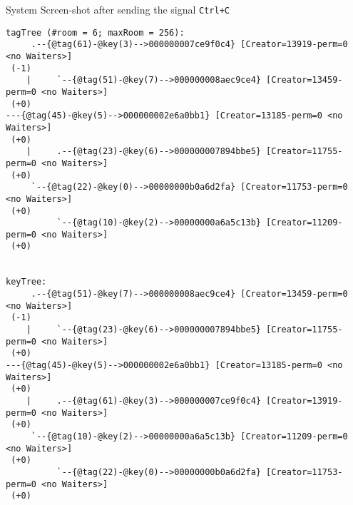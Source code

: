 \begin{center}\begin{large}
System Screen-shot after sending the signal \verb|Ctrl+C|
\end{large}\end{center}

\begin{indentPar}{1.5cm}
\begin{scriptsize}\begin{verbatim}
tagTree (#room = 6; maxRoom = 256):
     .--{@tag(61)-@key(3)-->000000007ce9f0c4} [Creator=13919-perm=0 <no Waiters>]
 (-1)
    |     `--{@tag(51)-@key(7)-->000000008aec9ce4} [Creator=13459-perm=0 <no Waiters>]
 (+0)
---{@tag(45)-@key(5)-->000000002e6a0bb1} [Creator=13185-perm=0 <no Waiters>]
 (+0)
    |     .--{@tag(23)-@key(6)-->000000007894bbe5} [Creator=11755-perm=0 <no Waiters>]
 (+0)
     `--{@tag(22)-@key(0)-->00000000b0a6d2fa} [Creator=11753-perm=0 <no Waiters>]
 (+0)
          `--{@tag(10)-@key(2)-->00000000a6a5c13b} [Creator=11209-perm=0 <no Waiters>]
 (+0)


keyTree:
     .--{@tag(51)-@key(7)-->000000008aec9ce4} [Creator=13459-perm=0 <no Waiters>]
 (-1)
    |     `--{@tag(23)-@key(6)-->000000007894bbe5} [Creator=11755-perm=0 <no Waiters>]
 (+0)
---{@tag(45)-@key(5)-->000000002e6a0bb1} [Creator=13185-perm=0 <no Waiters>]
 (+0)
    |     .--{@tag(61)-@key(3)-->000000007ce9f0c4} [Creator=13919-perm=0 <no Waiters>]
 (+0)
     `--{@tag(10)-@key(2)-->00000000a6a5c13b} [Creator=11209-perm=0 <no Waiters>]
 (+0)
          `--{@tag(22)-@key(0)-->00000000b0a6d2fa} [Creator=11753-perm=0 <no Waiters>]
 (+0)
\end{verbatim}\end{scriptsize}
\end{indentPar}

